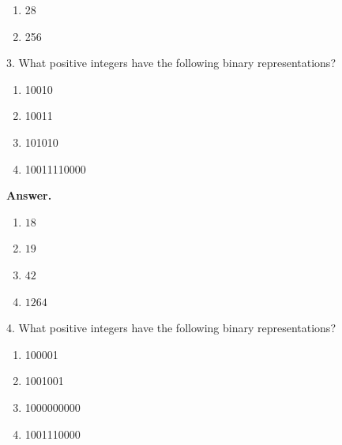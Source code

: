 \documentclass[10pt,]{book}
\theoremstyle{plain}
\theoremstyle{definition}
\theoremstyle{definition}
\theoremstyle{definition}
\theoremstyle{definition}
\begin{document}
\begin{exercisegroup}
\begin{multicols}{2}
\begin{enumerate}[label=\alph*]
\item\hypertarget{li-192}{}28%
\item\hypertarget{li-193}{}256 %
\end{enumerate}
\end{multicols}
%
\par\smallskip
\item[3.]\hypertarget{exercise-26}{}What positive integers have the following binary representations?%
\par
\leavevmode%
\begin{multicols}{2}
\begin{enumerate}[label=\alph*]
\item\hypertarget{li-194}{} 10010%
\item\hypertarget{li-195}{} 10011%
\item\hypertarget{li-196}{}101010%
\item\hypertarget{li-197}{}10011110000 %
\end{enumerate}
\end{multicols}
%
\par\smallskip
\par\smallskip
\noindent\textbf{Answer.}\hypertarget{answer-14}{}\quad
\leavevmode%
\begin{multicols}{2}
\begin{enumerate}[label=\alph*]
\item\hypertarget{li-198}{} \(18\)%
\item\hypertarget{li-199}{} \(19\)%
\item\hypertarget{li-200}{} \(42\)%
\item\hypertarget{li-201}{} \(1264\)%
\end{enumerate}
\end{multicols}
%
\item[4.]\hypertarget{exercise-27}{}What positive integers have the following binary representations?%
\par
\leavevmode%
\begin{multicols}{2}
\begin{enumerate}[label=\alph*]
\item\hypertarget{li-202}{} 100001%
\item\hypertarget{li-203}{} 1001001%
\item\hypertarget{li-204}{}1000000000%
\item\hypertarget{li-205}{}1001110000 %
\end{enumerate}
\end{multicols}
%
\par\smallskip

\end{exercisegroup}
\end{document}
